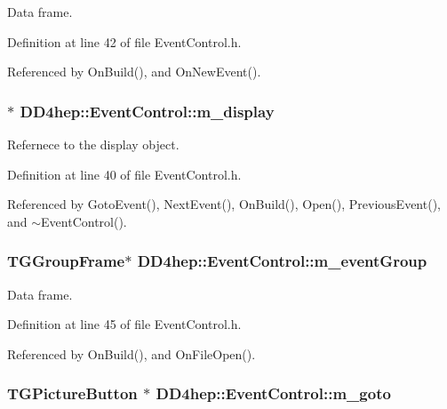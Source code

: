 Data frame. 

Definition at line 42 of file EventControl.h.

Referenced by OnBuild(), and OnNewEvent().\hypertarget{class_d_d4hep_1_1_event_control_ad9786c7cb28b2c715ba6343a2c62362a}{
\subsubsection[{m\_\-display}]{$\ast$ {\bf DD4hep::EventControl::m\_\-display}}}
\label{class_d_d4hep_1_1_event_control_ad9786c7cb28b2c715ba6343a2c62362a}


Refernece to the display object. 

Definition at line 40 of file EventControl.h.

Referenced by GotoEvent(), NextEvent(), OnBuild(), Open(), PreviousEvent(), and $\sim$EventControl().\hypertarget{class_d_d4hep_1_1_event_control_a26358da45905074e309f36f245558a92}{
\subsubsection[{m\_\-eventGroup}]{\setlength{\rightskip}{0pt plus 5cm}TGGroupFrame$\ast$ {\bf DD4hep::EventControl::m\_\-eventGroup}}}
\label{class_d_d4hep_1_1_event_control_a26358da45905074e309f36f245558a92}


Data frame. 

Definition at line 45 of file EventControl.h.

Referenced by OnBuild(), and OnFileOpen().\hypertarget{class_d_d4hep_1_1_event_control_ac6976dc6f6e1356fa5e6243338f41d05}{
\subsubsection[{m\_\-goto}]{\setlength{\rightskip}{0pt plus 5cm}TGPictureButton $\ast$ {\bf DD4hep::EventControl::m\_\-goto}}}
\label{class_d_d4hep_1_1_event_control_ac6976dc6f6e1356fa5e6243338f41d05}


